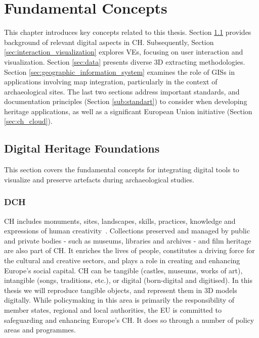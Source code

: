 
%

\chapter{Fundamental Concepts}
\label{cha:fundamental_concepts}

This chapter introduces key concepts related to this thesis. Section \ref{sec:digital_heritage_foundation}
provides background of relevant digital aspects in \gls{CH}.
Subsequently, Section \ref{sec:interaction_visualization} explores \glspl{VE}, focusing on user interaction and visualization. 
Section \ref{sec:data} presents diverse \gls{3D} extracting methodologies.
Section \ref{sec:geographic_information_system} examines the role of \glspl{GIS} in applications involving map integration, particularly in the context of archaeological sites. 
The last two sections address important standards, and documentation principles (Section \ref{sub:standart}) to consider when developing heritage applications, as well as a significant European Union initiative (Section \ref{sec:ch_cloud}).

\section{Digital Heritage Foundations}
\label{sec:digital_heritage_foundation}

This section covers the fundamental concepts for integrating digital tools to visualize and preserve artefacts during archaeological studies.

\subsection{\gls{DCH}}
\label{sec:digital_heritage}

\gls{CH} includes monuments, sites, landscapes, skills, practices, knowledge and expressions of human creativity~\cite{eu_cultural_heritage}. Collections preserved and managed by public and private bodies - such as museums, libraries and archives - and film heritage are also part of CH. It enriches the lives of people, constitutes a driving force for the cultural and creative sectors, and plays a role in creating and enhancing Europe's social capital.
\gls{CH} can be tangible (castles, museums, works of art), intangible (songs, traditions, etc.), or
digital (born-digital and digitised). In this thesis we will reproduce tangible objects, and represent them in \gls{3D} models digitally.
While policymaking in this area is primarily the responsibility of member states, regional and local authorities, the \gls{EU} is committed to safeguarding and enhancing Europe's \gls{CH}. It does so through a number of policy areas and programmes.


